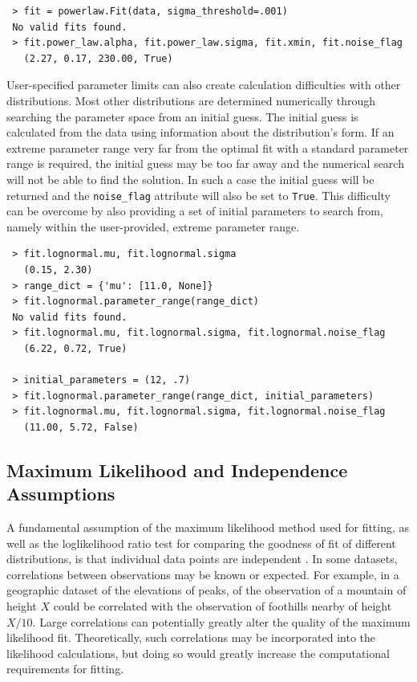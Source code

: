 \documentclass[10pt]{article}
\begin{document}
 \begin{verbatim}
 > fit = powerlaw.Fit(data, sigma_threshold=.001)
 No valid fits found.
 > fit.power_law.alpha, fit.power_law.sigma, fit.xmin, fit.noise_flag
   (2.27, 0.17, 230.00, True)
 \end{verbatim}
 
 User-specified parameter limits can also create calculation difficulties with other distributions. Most other distributions are determined numerically through searching the parameter space from an initial guess. The initial guess is calculated from the data using information about the distribution's form. If an extreme parameter range very far from the optimal fit with a standard parameter range is required, the initial guess may be too far away and the numerical search will not be able to find the solution. In such a case the initial guess will be returned and the \verb$noise_flag$ attribute will also be set to \verb$True$. This difficulty can be overcome by also providing a set of initial parameters to search from, namely within the user-provided, extreme parameter range. 
 
 \begin{verbatim}
 > fit.lognormal.mu, fit.lognormal.sigma
   (0.15, 2.30)
 > range_dict = {'mu': [11.0, None]}
 > fit.lognormal.parameter_range(range_dict)
 No valid fits found.
 > fit.lognormal.mu, fit.lognormal.sigma, fit.lognormal.noise_flag
   (6.22, 0.72, True)
 
 > initial_parameters = (12, .7)
 > fit.lognormal.parameter_range(range_dict, initial_parameters)
 > fit.lognormal.mu, fit.lognormal.sigma, fit.lognormal.noise_flag
   (11.00, 5.72, False)
 \end{verbatim}
 
 
 \subsection*{Maximum Likelihood and Independence Assumptions}
 A fundamental assumption of the maximum likelihood method used for fitting, as well as the loglikelihood ratio test for comparing the goodness of fit of different distributions, is that individual data points are independent \cite{Clauset2009}. In some datasets, correlations between observations may be known or expected. For example, in a geographic dataset of the elevations of peaks, of the observation of a mountain of height $X$ could be correlated with the observation of foothills nearby of height $X/10$. Large correlations can potentially greatly alter the quality of the maximum likelihood fit. Theoretically, such correlations may  be incorporated into the likelihood calculations, but doing so would greatly increase the computational requirements for fitting.
 
\end{document}
